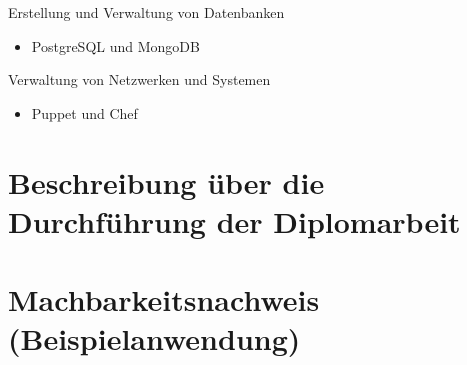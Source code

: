 Erstellung und Verwaltung von Datenbanken
\begin{itemize}
    \item PostgreSQL und MongoDB
\end{itemize}

Verwaltung von Netzwerken und Systemen
\begin{itemize}
    \item Puppet und Chef
\end{itemize}


\newpage
\section{Beschreibung über die Durchführung der Diplomarbeit}



\newpage
\section{Machbarkeitsnachweis (Beispielanwendung)}

